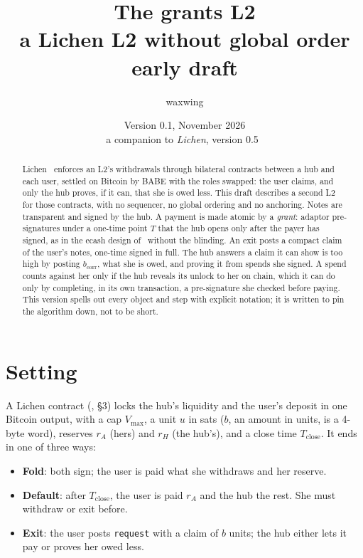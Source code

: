 \documentclass[11pt]{article}
\title{\textbf{The grants L2}\\a Lichen L2 without global order\\[2pt]\large early draft}
\author{waxwing}
\date{Version 0.1, November 2026\\[2pt]\small a companion to \emph{Lichen}, version 0.5~\cite{lichen}}
\theoremstyle{plain}
\theoremstyle{definition}
\newcommand{\vmax}{V_{\max}}
\newcommand{\Tc}{T_{\mathrm{close}}}
\newcommand{\bcorr}{b_{\mathrm{corr}}}
\newcommand{\tx}[1]{\texttt{#1}}
\begin{document}
\maketitle

\begin{abstract}
Lichen~\cite{lichen} enforces an L2's withdrawals through bilateral
contracts between a hub and each user, settled on Bitcoin by BABE with
the roles swapped: the user claims, and only the hub proves, if it can,
that she is owed less. This draft describes a second L2 for those
contracts, with no sequencer, no global ordering and no anchoring. Notes
are transparent and signed by the hub. A payment is made atomic by a
\emph{grant}: adaptor pre-signatures under a one-time point $T$ that the
hub opens only after the payer has signed, as in the ecash design
of~\cite{ecash} without the blinding. An exit posts a compact claim of
the user's notes, one-time signed in full. The hub answers a claim it
can show is too high by posting $\bcorr$, what she is owed, and proving
it from spends she signed. A spend counts against her only if the hub
reveals its unlock to her on chain, which it can do only by completing,
in its own transaction, a pre-signature she checked before paying. This
version spells out every object and step with explicit notation; it is
written to pin the algorithm down, not to be short.
\end{abstract}

\tableofcontents

\section{Setting}

A Lichen contract (\cite{lichen}, \S3) locks the hub's liquidity and the
user's deposit in one Bitcoin output, with a cap $\vmax$, a unit $u$ in
sats ($b$, an amount in units, is a 4-byte word), reserves $r_A$ (hers)
and $r_H$ (the hub's), and a close time $\Tc$. It ends in one of three
ways:
\begin{itemize}[nosep]
\item \textbf{Fold}: both sign; the user is paid what she withdraws and
  her reserve.
\item \textbf{Default}: after $\Tc$, the user is paid $r_A$ and the hub
  the rest. She must withdraw or exit before.
\item \textbf{Exit}: the user posts \tx{request} with a claim of $b$
  units; the hub either lets it pay or proves her owed less.
\end{itemize}
\end{document}
